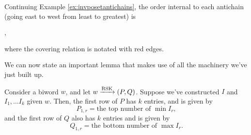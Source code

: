 \documentclass{article}
\DeclareMathOperator{\RSK}{RSK}
\newcommand{\rskarrow}{\ensuremath\xrightarrow{\RSK}}
\begin{document}
\begin{example}
    Continuing Example \ref{ex:invposetantichains}, the order internal to each antichain (going east to west from least to greatest) is
    \begin{center}
        ,
    \end{center}
    where the covering relation is notated with red edges.
\end{example}

We can now state an important lemma that makes use of all the machinery we've just built up.

\begin{lemma}\label{lem:invposetfirstrowrsk}
    Consider a biword $w$, and let $w \rskarrow (P, Q)$.
    Suppose we've constructed $I$ and $I_1, \ldots I_k$ given $w$.
    Then, the first row of $P$ has $k$ entries, and is given by
    \[
        P_{1,r} = \text{the top number of }\min I_r,
    \]
    and the first row of $Q$ also has $k$ entries and is given by
    \[
        Q_{1,r} = \text{the bottom number of }\max I_r.
    \]
\end{lemma}
\end{document}
